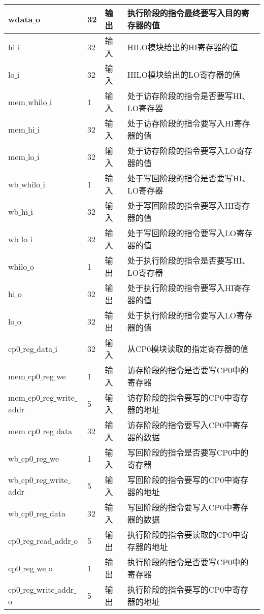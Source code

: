 \begin{table}[H]
\begin{tabular}{|l|l|l|l|}
		\hline
		wdata$\_$o & 32 & 输出 & 执行阶段的指令最终要写入目的寄存器的值 \\
		\hline
		hi$\_$i & 32 & 输入 & HILO模块给出的HI寄存器的值 \\
		\hline
		lo$\_$i & 32 & 输入 & HILO模块给出的LO寄存器的值 \\
		\hline
		mem$\_$whilo$\_$i & 1 & 输入 & 处于访存阶段的指令是否要写HI、LO寄存器 \\
		\hline
		mem$\_$hi$\_$i & 32 & 输入 & 处于访存阶段的指令要写入HI寄存器的值 \\
		\hline
		mem$\_$lo$\_$i & 32 & 输入 & 处于访存阶段的指令要写入LO寄存器的值 \\
		\hline
		wb$\_$whilo$\_$i & 1 & 输入 & 处于写回阶段的指令是否要写HI、LO寄存器 \\
		\hline
		wb$\_$hi$\_$i & 32 & 输入 & 处于写回阶段的指令要写入HI寄存器的值 \\
		\hline
		wb$\_$lo$\_$i & 32 & 输入 & 处于写回阶段的指令要写入LO寄存器的值 \\
		\hline
		whilo$\_$o & 1 & 输出 & 处于执行阶段的指令是否要写HI、LO寄存器 \\
		\hline
		hi$\_$o & 32 & 输出 & 处于执行阶段的指令要写入HI寄存器的值 \\
		\hline
		lo$\_$o & 32 & 输出 & 处于执行阶段的指令要写入LO寄存器的值 \\
		\hline
		cp0$\_$reg$\_$data$\_$i & 32 & 输入 & 从CP0模块读取的指定寄存器的值 \\
		\hline
		mem$\_$cp0$\_$reg$\_$we & 1 & 输入 & 访存阶段的指令是否要写CP0中的寄存器 \\
		\hline
		mem$\_$cp0$\_$reg$\_$write$\_$addr & 5 & 输入 & 访存阶段的指令要写的CP0中寄存器的地址 \\
		\hline
		mem$\_$cp0$\_$reg$\_$data & 32 & 输入 & 访存阶段的指令要写入CP0中寄存器的数据 \\
		\hline
		wb$\_$cp0$\_$reg$\_$we & 1 & 输入 & 写回阶段的指令是否要写CP0中的寄存器 \\
		\hline
		wb$\_$cp0$\_$reg$\_$write$\_$addr & 5 & 输入 & 写回阶段的指令要写的CP0中寄存器的地址 \\
		\hline
		wb$\_$cp0$\_$reg$\_$data & 32 & 输入 & 写回阶段的指令要写入CP0中寄存器的数据 \\
		\hline
		cp0$\_$reg$\_$read$\_$addr$\_$o & 5 & 输出 & 执行阶段的指令要读取的CP0中寄存器的地址 \\
		\hline
		cp0$\_$reg$\_$we$\_$o & 1 & 输出 & 执行阶段的指令是否要写CP0中的寄存器 \\
		\hline
		cp0$\_$reg$\_$write$\_$addr$\_$o & 5 & 输出 & 执行阶段的指令要写的CP0中寄存器的地址 \\

\end{tabular}
\end{table}
